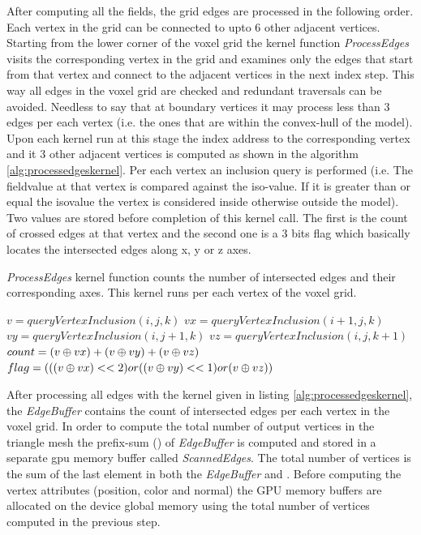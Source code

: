 After computing all the fields, the grid edges are processed in the following order. 
Each vertex in the grid can be connected to upto 6 other adjacent vertices. Starting from the lower corner of the voxel grid 
the kernel function \textit{ProcessEdges} visits the corresponding vertex in the grid and examines only the edges that start 
from that vertex and connect to the adjacent vertices in the next index step. This way all edges in the voxel grid are checked 
and redundant traversals can be avoided. Needless to say that at boundary vertices it may process less than 3 edges per each 
vertex (i.e. the ones that are within the convex-hull of the model). Upon each kernel run at this stage the index address to 
the corresponding vertex and it 3 other adjacent vertices is computed as shown in the algorithm \ref{alg:processedgeskernel}. Per each vertex
an inclusion query is performed (i.e. The fieldvalue at that vertex is compared against the iso-value. If it is greater than or equal 
the isovalue the vertex is considered inside otherwise outside the model). Two values are stored before completion of this kernel call. 
The first is the count of crossed edges at that vertex and the second one is a 3 bits flag which basically locates the intersected 
edges along x, y or z axes.


\begin{algorithm}[H]
\caption{\textit{ProcessEdges} kernel function counts the number of intersected edges and their corresponding axes. This kernel runs per each
vertex of the voxel grid.}
\label{alg:processedgeskernel}
\begin{algorithmic}[1]	
  \STATE $v = queryVertexInclusion(i, j, k)$
  \STATE $vx = queryVertexInclusion(i+1, j, k)$
  \STATE $vy = queryVertexInclusion(i, j+1, k)$
  \STATE $vz = queryVertexInclusion(i, j, k+1)$
  \STATE $count = (v \mathbin{\oplus} vx) + (v \mathbin{\oplus} vy) + (v \mathbin{\oplus} vz)$
  \STATE $flag = (((v \mathbin{\oplus} vx) << 2) or ((v \mathbin{\oplus} vy) << 1) or (v \mathbin{\oplus} vz))$
\end{algorithmic}
\end{algorithm}


After processing all edges with the kernel given in listing \ref{alg:processedgeskernel}, the \textit{EdgeBuffer} 
contains the count of intersected edges per each vertex in the voxel grid. In order to compute the total number of 
output vertices in the triangle mesh the prefix-sum (\cite{Sengupta2007}) of \textit{EdgeBuffer} is computed and
stored in a separate gpu memory buffer called \textit{ScannedEdges}. The total number of vertices is the sum of the
last element in both the \textit{EdgeBuffer} and . Before computing the vertex 
attributes (position, color and normal) the GPU memory buffers are allocated on the device global memory using the total number 
of vertices computed in the previous step. 

